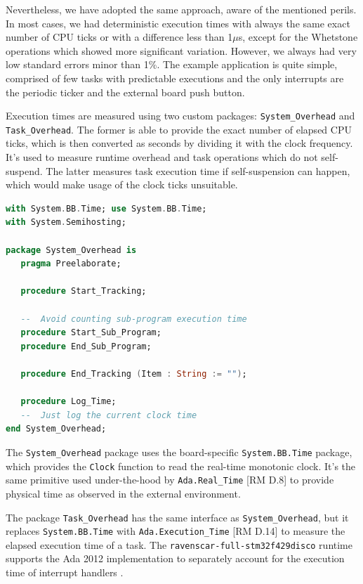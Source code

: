 \documentclass{article}
\begin{document}
Nevertheless, we have adopted the same approach, aware of the mentioned perils. In most cases, we had deterministic execution times with always the same exact number of CPU ticks or with a difference less than 1$\mu$s, except for the Whetstone operations which showed more significant variation. However, we always had very low standard errors minor than 1\%. The example application is quite simple, comprised of few tasks with predictable executions and the only interrupts are the periodic ticker and the external board push button.

Execution times are measured using two custom packages: \texttt{System\_Overhead} and \texttt{Task\_Overhead}. The former is able to provide the exact number of elapsed CPU ticks, which is then converted as seconds by dividing it with the clock frequency. It's used to measure runtime overhead and task operations which do not self-suspend. The latter measures task execution time if self-suspension can happen, which would make usage of the clock ticks unsuitable.

\begin{lstlisting}[language=Ada]
with System.BB.Time; use System.BB.Time;
with System.Semihosting;

package System_Overhead is
   pragma Preelaborate;

   procedure Start_Tracking;

   --  Avoid counting sub-program execution time
   procedure Start_Sub_Program;
   procedure End_Sub_Program;

   procedure End_Tracking (Item : String := "");

   procedure Log_Time;
   --  Just log the current clock time
end System_Overhead;
\end{lstlisting}

The \texttt{System\_Overhead} package uses the board-specific \texttt{System.BB.Time} package, which provides the \texttt{Clock} function to read the real-time monotonic clock. It's the same primitive used under-the-hood by \texttt{Ada.Real\_Time} [RM D.8] to provide physical time as observed in the external environment.

The package \texttt{Task\_Overhead} has the same interface as \texttt{System\_Overhead}, but it replaces \texttt{System.BB.Time} with \texttt{Ada.Execution\_Time} [RM D.14] to measure the elapsed execution time of a task. The \texttt{ravenscar-full-stm32f429disco} runtime supports the Ada 2012 implementation to separately account for the execution time of interrupt handlers \cite{etc}.
\end{document}
